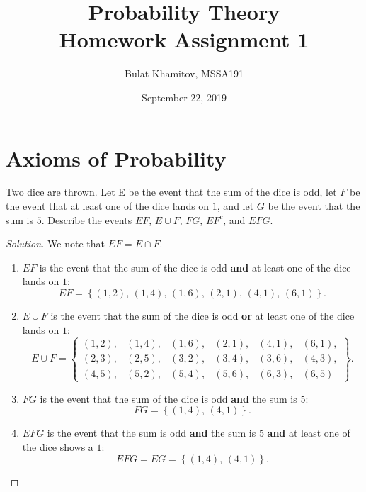 \documentclass{article}[12pt]
\title{Probability Theory \\ Homework Assignment 1}
\author{Bulat Khamitov, MSSA191}
\date{September 22, 2019}
\newenvironment{solution}
  {\renewcommand\qedsymbol{$\blacksquare$}\begin{proof}[Solution]}
  {\end{proof}}
\newenvironment{problem}[1]
  {\renewcommand\theinnercustomprblm{#1}\innercustomprblm}
  {\endinnercustomprblm}
\begin{document}
\maketitle

\section{Axioms of Probability}

\begin{problem}{3}\normalfont
Two dice are thrown.
Let E be the event that the sum of the dice is odd, let $F$ be the event that at least one of the dice lands on $1$, and let $G$ be the event that the sum is $5$.
Describe the events $EF$, $E\cup F$, $FG$, $EF^{c}$, and $EFG$.
\end{problem}

\begin{solution}
We note that $EF = E \cap F$.
\begin{enumerate}
    \item $EF$ is the event that the sum of the dice is odd \textbf{and} at least one of the dice lands on $1$:
    \begin{equation*}
        EF = \left\{(1, 2),\, (1, 4),\, (1, 6),\, (2, 1),\, (4, 1),\, (6, 1)\right\}.
    \end{equation*}

    \item $E\cup F$ is the event that the sum of the dice is odd \textbf{or} at least one of the dice lands on $1$:
    \begin{equation*}
        E\cup F =
        \begin{Bmatrix}
        (1, 2), & (1, 4), & (1, 6), & (2, 1), & (4, 1), & (6, 1),
        \\
        (2, 3), & (2, 5), & (3, 2), & (3, 4), & (3, 6), & (4, 3),
        \\
        (4, 5), & (5, 2), & (5, 4), & (5, 6), & (6, 3), & (6, 5)
        \end{Bmatrix}.
    \end{equation*}

    \item $FG$ is the event that the sum of the dice is odd \textbf{and} the sum is $5$:
    \begin{equation*}
        FG = \left\{(1, 4),\, (4, 1)\right\}.
    \end{equation*}

    \item $EFG$ is the event that the sum is odd \textbf{and} the sum is $5$ \textbf{and} at least one of the dice shows a $1$:
    \begin{equation*}
        EFG = EG = \left\{(1, 4),\, (4, 1)\right\}.
    \end{equation*}


\end{enumerate}
\end{solution}
\end{document}
